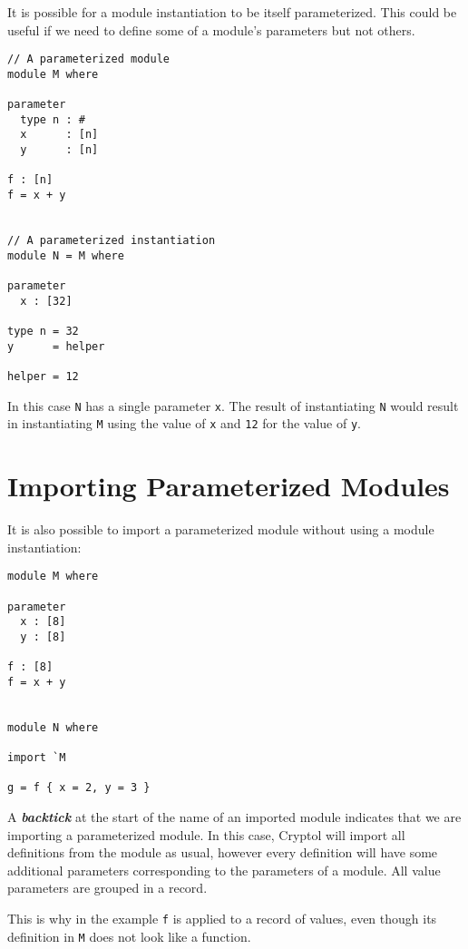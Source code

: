 It is possible for a module instantiation to be itself parameterized.
This could be useful if we need to define some of a module's parameters
but not others.

\begin{verbatim}
// A parameterized module
module M where

parameter
  type n : #
  x      : [n]
  y      : [n]

f : [n]
f = x + y


// A parameterized instantiation
module N = M where

parameter
  x : [32]

type n = 32
y      = helper

helper = 12
\end{verbatim}

In this case \texttt{N} has a single parameter \texttt{x}. The result of
instantiating \texttt{N} would result in instantiating \texttt{M} using
the value of \texttt{x} and \texttt{12} for the value of \texttt{y}.

\hypertarget{importing-parameterized-modules}{%
\section{Importing Parameterized
Modules}\label{importing-parameterized-modules}}

It is also possible to import a parameterized module without using a
module instantiation:

\begin{verbatim}
module M where

parameter
  x : [8]
  y : [8]

f : [8]
f = x + y


module N where

import `M

g = f { x = 2, y = 3 }
\end{verbatim}

A \textbf{\emph{backtick}} at the start of the name of an imported
module indicates that we are importing a parameterized module. In this
case, Cryptol will import all definitions from the module as usual,
however every definition will have some additional parameters
corresponding to the parameters of a module. All value parameters are
grouped in a record.

This is why in the example \texttt{f} is applied to a record of values,
even though its definition in \texttt{M} does not look like a function.

